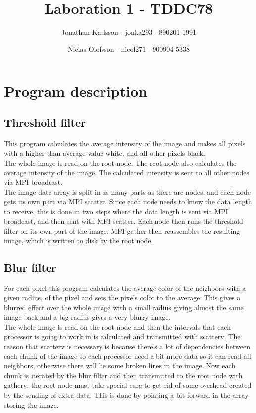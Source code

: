\documentclass[a4paper]{article}
\author{Jonathan Karlsson - jonka293 - 890201-1991 \and Niclas Olofsson - nicol271 - 900904-5338}
\title{Laboration 1 - TDDC78}
\begin{document}
\maketitle

\section{Program description}
\subsection{Threshold filter}

This program calculates the average intensity of the image and makes all
pixels with a higher-than-average value white, and all other pixels
black.\\

The whole image is read on the root node. The root node also calculates
the  average intensity of the image. The calculated intensity is sent to
all other nodes via MPI broadcast.\\

The image data array is split in as many parts as there are nodes, and
each node gets its own part via MPI scatter. Since each node needs to
know  the data length to receive, this is done in two steps where the
data length is sent via MPI broadcast, and then sent with MPI scatter.
Each node then runs the threshold filter on its own part of the image.
MPI gather then reassembles the resulting image, which is written to
disk by the root node.\\

\subsection{Blur filter}
For each pixel this program calculates the average color of the neighbors with a given radius, of the pixel and sets the pixels color to the average. This gives a blurred effect over the whole image with a small radius giving almost the same image back and a big radius gives a very blurry image.\\

 The whole image is read on the root node and then the intervals that each processor is going to work in is calculated and transmitted with scatterv. The reason that scatterv is necessary is because there\rq{}s a lot of dependencies between each chunk of the image so each processor need a bit more data so it can read all neighbors, otherwise there will be some broken lines in the image. Now each chunk is iterated by the blur filter and then transmitted to the root node with gatherv, the root node must take special care to get rid of some overhead created by the sending of extra data. This is done by pointing a bit forward in the array storing the image.
\end{document}
